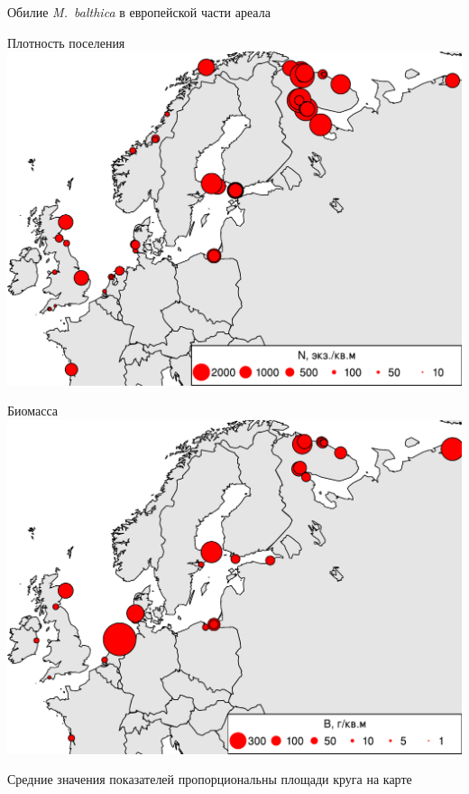 \documentclass{beamer}
\begin{document}
\begin{frame}{Обилие {\it M.~balthica} в европейской части ареала}
	\begin{minipage}[t]{.49\linewidth}
		\begin{center}
		{\footnotesize Плотность поселения}
			\includegraphics[width=\textwidth]{Nmean_ru1.pdf}\\[1ex]
		\end{center}
	\end{minipage}
%
	\begin{minipage}[t]{.49\linewidth}
		\begin{center}
		{\footnotesize Биомасса}
			\includegraphics[width=\textwidth]{Bmean_ru1.pdf}\\[1ex]
		\end{center}
	\end{minipage}

{\tiny Средние значения показателей пропорциональны площади круга на карте}
\end{frame}
\end{document}
